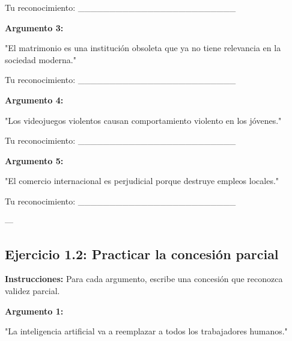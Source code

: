 \documentclass[a4paper,11pt]{article}
\begin{document}
\vspace{0.2cm}

Tu reconocimiento: _________________________

\vspace{0.2cm}

\textbf{Argumento 3:}

"El matrimonio es una institución obsoleta que ya no tiene relevancia en la sociedad moderna."

\vspace{0.2cm}

Tu reconocimiento: _________________________

\vspace{0.2cm}

\textbf{Argumento 4:}

"Los videojuegos violentos causan comportamiento violento en los jóvenes."

\vspace{0.2cm}

Tu reconocimiento: _________________________

\vspace{0.2cm}

\textbf{Argumento 5:}

"El comercio internacional es perjudicial porque destruye empleos locales."

\vspace{0.2cm}

Tu reconocimiento: _________________________

\vspace{0.2cm}

---

\vspace{0.2cm}

\subsection{Ejercicio 1.2: Practicar la concesión parcial}

\vspace{0.2cm}

\textbf{Instrucciones:} Para cada argumento, escribe una concesión que reconozca validez parcial.

\vspace{0.2cm}

\textbf{Argumento 1:}

"La inteligencia artificial va a reemplazar a todos los trabajadores humanos."

\vspace{0.2cm}
\end{document}
